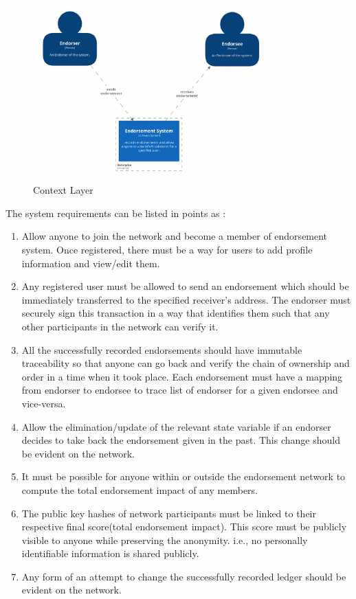 \begin{figure}
	\centering
	\includegraphics[width=0.8\textwidth]{Images/1SystemContext.eps}
	\caption{Context Layer}
\end{figure}


The system requirements can be listed in points as : \\
\begin{enumerate}
	\item Allow anyone to join the network and become a member of endorsement
		system. Once registered, there must be a way for users to add profile
		information and view/edit them. 
	\item Any registered user must be allowed to send an endorsement which
		should be immediately transferred to the specified receiver's address.
		The endorser must securely sign this transaction in a way that
		identifies them such that any other participants in the network can
		verify it.
	\item All the successfully recorded endorsements should have immutable
		traceability so that anyone can go back and verify the chain of
		ownership and order in a time when it took place. Each endorsement must
		have a mapping from endorser to endorsee to trace list of endorser for
		a given endorsee and vice-versa.
	\item Allow the elimination/update of the relevant state variable if an
		endorser decides to take back the endorsement given in the past. This
		change should be evident on the network.  
	\item It must be possible for anyone within or outside the endorsement
		network to compute the total endorsement impact of any members.
	\item The public key hashes of network participants must be linked to their
		respective final score(total endorsement impact). This score must be
		publicly visible to anyone while preserving the anonymity. i.e., no
		personally identifiable information is shared publicly.
	\item Any form of an attempt to change the successfully recorded ledger
		should be evident on the network. 
\end{enumerate}

